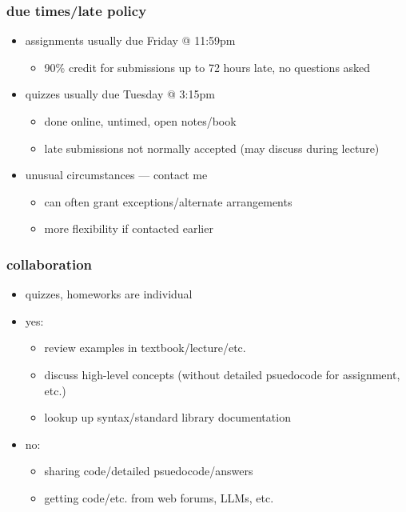 \begin{frame}\frametitle{due times/late policy}
    \begin{itemize}
    \item assignments usually due Friday @ 11:59pm
        \begin{itemize}
        \item 90\% credit for submissions up to 72 hours late, no questions asked
        \end{itemize}
    \item quizzes usually due Tuesday @ 3:15pm
        \begin{itemize}
        \item done online, untimed, open notes/book
        \item late submissions not normally accepted (may discuss during lecture)
        \end{itemize}
    \vspace{.5cm}
    \item unusual circumstances --- contact me
        \begin{itemize}
        \item can often grant exceptions/alternate arrangements
        \item more flexibility if contacted earlier
        \end{itemize}
    \end{itemize}
\end{frame}

\begin{frame}\frametitle{collaboration}
    \begin{itemize}
    \item quizzes, homeworks are individual
    \vspace{.5cm}
    \item yes:
        \begin{itemize}
        \item review examples in textbook/lecture/etc.
        \item discuss high-level concepts (without detailed psuedocode for assignment, etc.)
        \item lookup up syntax/standard library documentation
        \end{itemize}
    \item no:
        \begin{itemize}
        \item sharing code/detailed psuedocode/answers
        \item getting code/etc. from web forums, LLMs, etc.
        \end{itemize}
    \end{itemize}
\end{frame}

